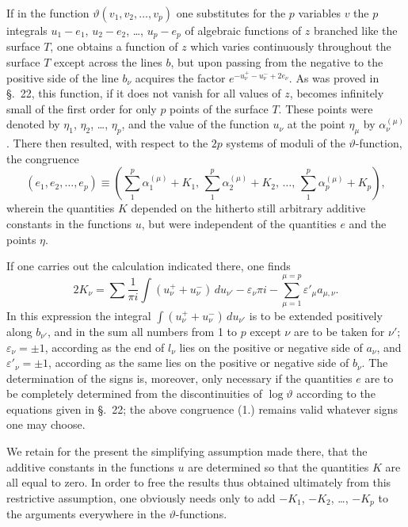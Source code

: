 \documentclass{article}
\begin{document}
If in the function $\vartheta(v_1, v_2, \dots, v_p)$ one substitutes for the $p$ variables $v$ the $p$ integrals $u_1-e_1$, $u_2-e_2$, \dots, $u_p-e_p$ of algebraic functions of $z$ branched like the surface
$T$, one obtains a function of $z$ which varies continuously throughout the surface $T$ except across the lines $b$, but upon passing from the negative to the positive side of the line $b_\nu$ acquires the factor $e^{-u^+_\nu-u^-_\nu+2e_\nu}$. As was proved in \S.~22, this function, if it does not vanish for all values of $z$, becomes infinitely small of the first order for only $p$ points of the surface $T$. These points were denoted by $\eta_1$, $\eta_2$, \dots, $\eta_p$, and the value of the function $u_\nu$ at the point $\eta_\mu$ by $\alpha_\nu^{(\mu)}$. There then resulted, with respect to the $2p$ systems of moduli of the $\vartheta$-function, the congruence
\[
\tag{(1.)}
(e_1, e_2, \dots, e_p) \equiv \left(\sum_1^p \alpha_1^{(\mu)} + K_1,\, \sum_1^p \alpha_2^{(\mu)} + K_2,\, \dots,\, \sum_1^p \alpha_p^{(\mu)} + K_p\right),
\]
wherein the quantities $K$ depended on the hitherto still arbitrary additive constants in the functions $u$, but were independent of the quantities $e$ and the points $\eta$.

If one carries out the calculation indicated there, one finds
\[
\tag{(2.)}
2K_\nu = \sum \frac{1}{\pi i} \int (u_\nu^+ + u_\nu^-) \, du_{\nu'} - \varepsilon_\nu \pi i - \sum_{\mu=1}^{\mu=p} \varepsilon'_\mu a_{\mu,\nu}.
\]
In this expression the integral $\displaystyle\int (u_\nu^+ + u_\nu^-) \, du_{\nu'}$ is to be extended positively along $b_{\nu'}$, and in the sum all numbers from 1 to $p$ except $\nu$ are to be taken for $\nu'$; $\varepsilon_\nu = \pm 1$, according as the end of $l_\nu$ lies on the positive or negative side of $a_\nu$, and $\varepsilon'_\nu = \pm 1$, according as the same lies on the positive or negative side of $b_\nu$. The determination of the signs is, moreover, only necessary if the quantities $e$ are to be completely determined from the discontinuities of $\log \vartheta$ according to the equations given in \S.~22; the above congruence (1.) remains valid whatever signs one may choose.

We retain for the present the simplifying assumption made there, that the additive constants in the functions $u$ are determined so that the quantities $K$ are all equal to zero. In order to free the results thus obtained ultimately from this restrictive assumption, one obviously needs only to add $-K_1$, $-K_2$, \dots, $-K_p$ to the arguments everywhere in the $\vartheta$-functions.
\end{document}
